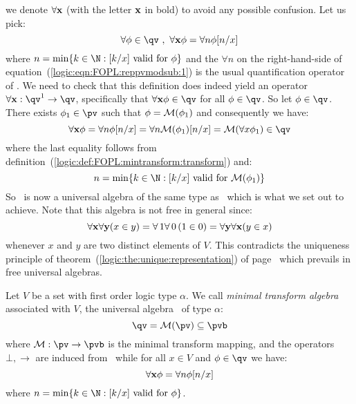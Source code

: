we denote $\forall{\bf x}$ (with the letter $\bf x$ in bold) to
avoid any possible confusion. Let us pick:
    \begin{equation}\label{logic:eqn:FOPL:reppvmodsub:1}
    \forall\phi\in\qv\ ,\ \forall{\bf x}\phi = \forall n\phi[n/x]
    \end{equation}
where $n=\min\{k\in\N:\mbox{$[k/x]$ valid for $\phi$}\}$ and the
$\forall n$ on the right-hand-side of
equation~(\ref{logic:eqn:FOPL:reppvmodsub:1}) is the usual
quantification operator of \pvb. We need to check that this
definition does indeed yield an operator $\forall {\bf
x}:\qv^{1}\to\qv$, specifically that $\forall {\bf x}\phi\in\qv$ for
all $\phi\in\qv$. So let $\phi\in\qv$. There exists $\phi_{1}\in\pv$
such that $\phi={\cal M}(\phi_{1})$ and consequently we have:
    \[
    \forall{\bf x}\phi=\forall n\phi[n/x]=\forall n{\cal
    M}(\phi_{1})[n/x]={\cal M}(\forall x\phi_{1})\in\qv
    \]
where the last equality follows from
definition~(\ref{logic:def:FOPL:mintransform:transform}) and:
    \[
    n=\min\{k\in\N:\mbox{$[k/x]$ valid for ${\cal M}(\phi_{1})$}\}
    \]
So \qv\ is now a universal algebra of the same type as \pv\ which is
what we set out to achieve. Note that this algebra is not free in
general since:
    \[
    \forall{\bf x}\forall{\bf y}(x\in y)=\forall\,1\forall\,0\,(1\in
    0)=\forall{\bf y}\forall{\bf x}(y\in x)
    \]
whenever $x$ and $y$ are two distinct elements of $V$. This
contradicts the uniqueness principle of
theorem~(\ref{logic:the:unique:representation}) of
page~\pageref{logic:the:unique:representation} which prevails in
free universal algebras.
\begin{defin}\label{logic:def:FOPL:reppvmodsub:qv}
Let $V$ be a set with first order logic type $\alpha$. We call {\em
minimal transform algebra} associated with $V$, the universal
algebra \qv\ of type $\alpha$:
    \[
    \qv={\cal M}(\pv)\subseteq\pvb
    \]
where ${\cal M}:\pv\to\pvb$ is the minimal transform mapping, and
the operators $\bot, \to$ are induced from \pvb\ while for all $x\in
V$ and $\phi\in\qv$ we have:
   \[
   \forall{\bf x}\phi = \forall n\phi[n/x]
   \]
where $n=\min\{k\in\N:\mbox{$[k/x]$ valid for $\phi$}\}$.
\end{defin}

